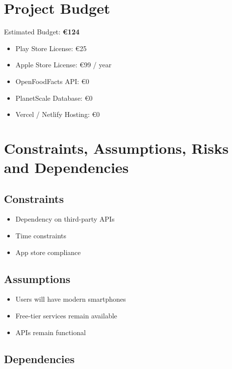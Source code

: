 \documentclass[11pt,a4paper]{article}
\begin{document}
    \section*{Project Budget}

    Estimated Budget: \textbf{€124}

    \begin{itemize}
        \item Play Store License: €25
        \item Apple Store License: €99 / year
        \item OpenFoodFacts API: €0
        \item PlanetScale Database: €0
        \item Vercel / Netlify Hosting: €0
    \end{itemize}

    \section*{Constraints, Assumptions, Risks and Dependencies}

    \subsection*{Constraints}

    \begin{itemize}
        \item Dependency on third-party APIs
        \item Time constraints
        \item App store compliance
    \end{itemize}

    \subsection*{Assumptions}

    \begin{itemize}
        \item Users will have modern smartphones
        \item Free-tier services remain available
        \item APIs remain functional
    \end{itemize}

    \subsection*{Dependencies}
\end{document}
